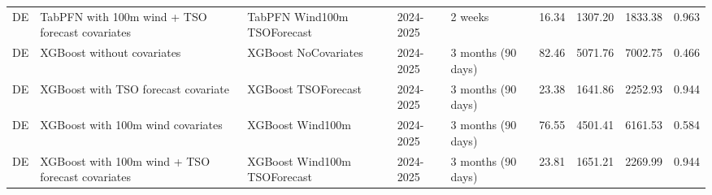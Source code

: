 \begin{longtable}{lllllllll}
DE & TabPFN with 100m wind + TSO forecast covariates & TabPFN Wind100m TSOForecast & 2024-2025 & 2 weeks & 16.34 & 1307.20 & 1833.38 & 0.963 \\
DE & XGBoost without covariates & XGBoost NoCovariates & 2024-2025 & 3 months (90 days) & 82.46 & 5071.76 & 7002.75 & 0.466 \\
DE & XGBoost with TSO forecast covariate & XGBoost TSOForecast & 2024-2025 & 3 months (90 days) & 23.38 & 1641.86 & 2252.93 & 0.944 \\
DE & XGBoost with 100m wind covariates & XGBoost Wind100m & 2024-2025 & 3 months (90 days) & 76.55 & 4501.41 & 6161.53 & 0.584 \\
DE & XGBoost with 100m wind + TSO forecast covariates & XGBoost Wind100m TSOForecast & 2024-2025 & 3 months (90 days) & 23.81 & 1651.21 & 2269.99 & 0.944 \\
\end{longtable}

